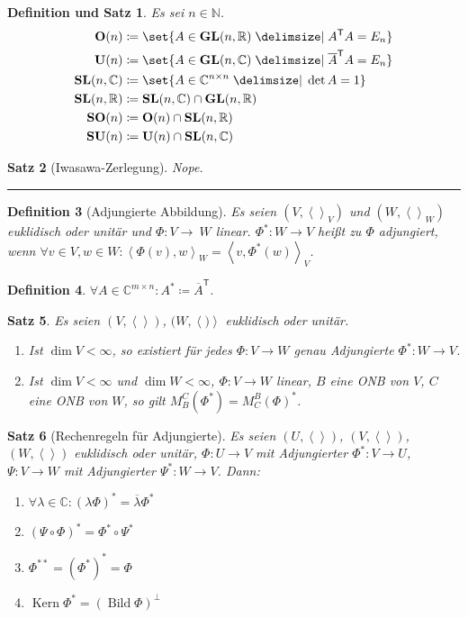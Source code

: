 \documentclass[a4paper]{article}
\newcounter{Sec}
\theoremstyle{marginbreak}
\newtheorem{definition}{Definition}[Sec]
\newtheorem{satz}[definition]{Satz}
\newtheorem{defsatz}[definition]{Definition und Satz}
\DeclareMathOperator{\Kern}{Kern}
\DeclareMathOperator{\Bild}{Bild}
\newcommand{\sep}{%
	\rule{\textwidth}{0.3pt}%
	\stepcounter{Sec}%
	}
\newcommand\conj{\overline}
\newcommand\scp[1]{\left\langle#1\right\rangle}
\newcommand\transpose[1]{#1^{\mathsf{T}}}
\begin{document}
	\begin{defsatz}
		Es sei $n\in\mathbb{N}$.
		\begin{align*}
			\mathbf{O}(n) &\coloneqq \set{A\in\mathbf{GL}(n,\mathbb{R})\given \transpose{A}A=E_n}\\
			\mathbf{U}(n) &\coloneqq \set{A\in\mathbf{GL}(n,\mathbb{C})\given \transpose{\conj{A}}A=E_n}\\
			\mathbf{SL}(n, \mathbb{C}) &\coloneqq \set{A\in\mathbb{C}^{n\times n}\given\det A=1}\\
			\mathbf{SL}(n, \mathbb{R}) &\coloneqq \mathbf{SL}(n, \mathbb{C})\cap\mathbf{GL}(n, \mathbb{R})\\
			\mathbf{SO}(n) &\coloneqq \mathbf{O}(n)\cap\mathbf{SL}(n,\mathbb{R})\\
			\mathbf{SU}(n) &\coloneqq \mathbf{U}(n)\cap\mathbf{SL}(n,\mathbb{C})
		\end{align*}
	\end{defsatz}
	\begin{satz}[Iwasawa-Zerlegung]
		Nope.
	\end{satz}
	\sep
	\begin{definition}[Adjungierte Abbildung]
		Es seien $(V, \scp{}_V)$ und $(W, \scp{}_W)$ euklidisch oder unitär und
		$\Phi\colon V\to\ W$ linear. $\Phi^*\colon W\to V$ heißt zu $\Phi$ adjungiert,
		wenn $\forall v\in V, w\in W\colon \scp{\Phi(v), w}_W = \scp{v, \Phi^*(w)}_V$.
	\end{definition}
	\begin{definition}
		$\forall A\in\mathbb{C}^{m\times n}\colon A^*\coloneqq \transpose{\conj{A}}$.
	\end{definition}
	\begin{satz}
		Es seien $(V, \scp{})$, $(W, \scp)$ euklidisch oder unitär.
		\begin{enumerate}[label=(\alph*)]
			\item Ist $\dim V<\infty$, so existiert für jedes $\Phi\colon V\to W$ genau
				Adjungierte $\Phi^*\colon W\to V$.
			\item Ist $\dim V<\infty$ und $\dim W<\infty$, $\Phi\colon V\to W$ linear,
				$B$ eine ONB von $V$, $C$ eine ONB von $W$, so gilt $M^C_B(\Phi^*) = M^B_C(\Phi)^*$.
		\end{enumerate}
	\end{satz}
	\begin{satz}[Rechenregeln für Adjungierte]
		Es seien $(U, \scp{})$, $(V, \scp{})$, $(W, \scp{})$ euklidisch oder unitär,
		$\Phi\colon U\to V$ mit Adjungierter $\Phi^*\colon V\to U$, $\Psi\colon V\to W$
		mit Adjungierter $\Psi^*\colon W\to V$. Dann:
		\begin{enumerate}[label=(\alph*)]
			\item $\forall \lambda\in\mathbb{C}\colon (\lambda\Phi)^* = \conj{\lambda}\Phi^*$
			\item $(\Psi\circ\Phi)^* = \Phi^*\circ\Psi^*$
			\item $\Phi^{**} = (\Phi^*)^* = \Phi$
			\item $\Kern\Phi^* = (\Bild\Phi)^\perp$
		\end{enumerate}
	\end{satz}
\end{document}
